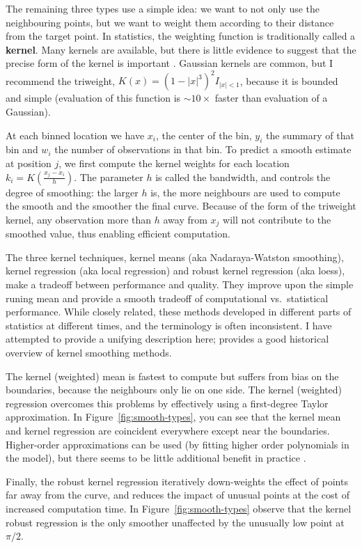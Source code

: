 \documentclass[journal]{vgtc}                %
\begin{document}
The remaining three types use a simple idea: we want to not only use the neighbouring points, but we want to weight them according to their distance from the target point. In statistics, the weighting function is traditionally called a {\bf kernel}. Many kernels are available, but there is little evidence to suggest that the precise form of the kernel is important \citep{cleveland:1996}. Gaussian kernels are common, but I recommend the triweight, $K(x) = (1 - |x|^3)^2 I_{|x| < 1}$, because it is bounded and simple (evaluation of this function is $\sim 10 \times$ faster than evaluation of a Gaussian).  

At each binned location we have $x_i$, the center of the bin, $y_i$ the summary of that bin and $w_i$ the number of observations in that bin. To predict a smooth estimate at position $j$, we first compute the kernel weights for each location $k_i = K(\frac{x_j - x_i}{h})$. The parameter $h$ is called the bandwidth, and controls the degree of smoothing: the larger $h$ is, the more neighbours are used to compute the smooth and the smoother the final curve. Because of the form of the triweight kernel, any observation more than $h$ away from $x_j$ will not contribute to the smoothed value, thus enabling efficient computation.

The three kernel techniques, kernel means (aka Nadaraya-Watston smoothing), kernel regression (aka local regression) and robust kernel regression (aka loess), make a tradeoff between performance and quality. They improve upon the simple runing mean and provide a smooth tradeoff of computational vs.\ statistical performance. While closely related, these methods developed in different parts of statistics at different times, and the terminology is often inconsistent. I have attempted to provide a unifying description here; \citep{cleveland:1996} provides a good historical overview of kernel smoothing methods.

The kernel (weighted) mean is fastest to compute but suffers from bias on the boundaries, because the neighbours only lie on one side. The kernel (weighted) regression overcomes this problems by effectively using a first-degree Taylor approximation. In Figure~\ref{fig:smooth-types}, you can see that the kernel mean and kernel regression are coincident everywhere except near the boundaries. Higher-order approximations can be used (by fitting higher order polynomials in the model), but there seems to be little additional benefit in practice \citep{cleveland:1996}.

Finally, the robust kernel regression iteratively down-weights the effect of points far away from the curve, and reduces the impact of unusual points at the cost of increased computation time. In Figure~\ref{fig:smooth-types} observe that the kernel robust regression is the only smoother unaffected by the unusually low point at $\pi / 2$.
\end{document}
